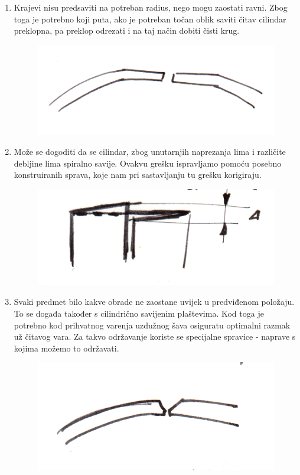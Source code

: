 \documentclass[a4paper,12pt]{article}
\numberwithin{figure}{section}
\begin{document}
\begin{enumerate}
\item Krajevi nisu predsaviti na potreban radius, nego mogu zaostati ravni. Zbog toga je potrebno koji puta, ako je potreban točan oblik saviti čitav cilindar preklopna, pa preklop odrezati i na taj način dobiti čisti krug.
\begin{figure}[!h]
\centering
\includegraphics[scale=0.1]{image_52-1.png}
\end{figure}
\FloatBarrier
\item Može se dogoditi da se cilindar, zbog unutarnjih naprezanja lima i različite debljine lima spiralno savije. Ovakvu grešku ispravljamo pomoću posebno konstruiranih sprava, koje nam pri sastavljanju tu grešku korigiraju.
\begin{figure}[!h]
\centering
\includegraphics[scale=0.1]{image_52-2.png}
\end{figure}
\FloatBarrier
\item Svaki predmet bilo kakve obrade ne zaostane uvijek u predviđenom položaju. To se događa također s cilindrično savijenim plaštevima. Kod toga je potrebno kod prihvatnog varenja uzdužnog šava osiguratu optimalni razmak už čitavog vara. Za takvo održavanje koriste se specijalne spravice - naprave s kojima možemo to  održavati.
\begin{figure}[!h]
\centering
\includegraphics[scale=0.1]{image_52-3.png}
\end{figure}
\FloatBarrier
\end{enumerate}
\clearpage
\end{document}
